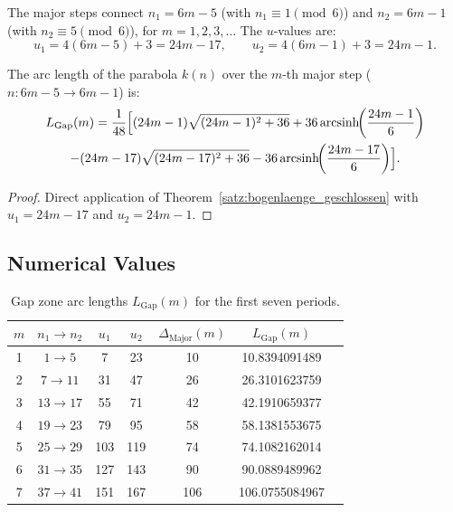The major steps connect $n_1 = 6m-5$ (with $n_1 \equiv 1 \pmod{6}$) and
$n_2 = 6m-1$ (with $n_2 \equiv 5 \pmod{6}$), for $m = 1, 2, 3, \ldots$
The $u$-values are:
\[
  u_1 = 4(6m-5)+3 = 24m - 17,
  \qquad
  u_2 = 4(6m-1)+3 = 24m - 1.
\]

\begin{satz}\label{satz:gap_zone}
The arc length of the parabola $k(n)$ over the $m$-th major step
($n: 6m-5 \to 6m-1$) is:
\begin{multline}
  L_{\mathrm{Gap}}(m)
  = \frac{1}{48}\Bigl[
      (24m-1)\sqrt{(24m-1)^2+36}
    + 36\operatorname{arcsinh}\!\!\left(\frac{24m-1}{6}\right)
    \\
    - (24m-17)\sqrt{(24m-17)^2+36}
    - 36\operatorname{arcsinh}\!\!\left(\frac{24m-17}{6}\right)
    \Bigr].
\end{multline}
\end{satz}

\begin{proof}
Direct application of Theorem~\ref{satz:bogenlaenge_geschlossen} with $u_1 = 24m-17$
and $u_2 = 24m-1$.
\end{proof}

\subsection{Numerical Values}

\begin{table}[H]
\centering
\caption{Gap zone arc lengths $L_{\mathrm{Gap}}(m)$ for the first
  seven periods.}
\renewcommand{\arraystretch}{1.2}
\begin{tabular}{ccccccc}
\toprule
$m$ & $n_1 \to n_2$ & $u_1$ & $u_2$ &
$\Delta_{\mathrm{Major}}(m)$ & $L_{\mathrm{Gap}}(m)$ \\
\midrule
1 &  $1 \to  5$ &  7 & 23 & 10 &  10.8394091489 \\
2 &  $7 \to 11$ & 31 & 47 & 26 &  26.3101623759 \\
3 & $13 \to 17$ & 55 & 71 & 42 &  42.1910659377 \\
4 & $19 \to 23$ & 79 & 95 & 58 &  58.1381553675 \\
5 & $25 \to 29$ & 103 & 119 & 74 & 74.1082162014 \\
6 & $31 \to 35$ & 127 & 143 & 90 & 90.0889489962 \\
7 & $37 \to 41$ & 151 & 167 & 106 & 106.0755084967 \\
\bottomrule
\end{tabular}
\end{table}

